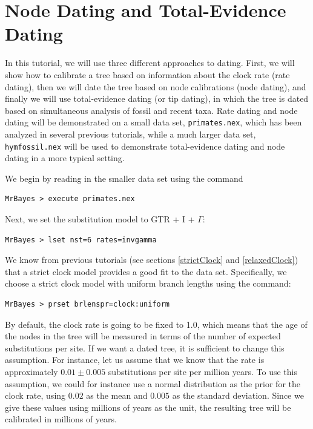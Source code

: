 \documentclass[12pt]{book}
\begin{document}
\section{Node Dating and Total-Evidence Dating}

In this tutorial, we will use three different approaches to dating. First, we will show how to
calibrate a tree based on information about the clock rate (rate dating), then we will date the
tree based on node calibrations (node dating), and finally we will use total-evidence dating (or
tip dating), in which the tree is dated based on simultaneous analysis of fossil and recent taxa.
Rate dating and node dating will be demonstrated on a small data set, \texttt{primates.nex}, which
has been analyzed in several previous tutorials, while a much larger data set,
\texttt{hymfossil.nex} will be used to demonstrate total-evidence dating and node dating in a more
typical setting.

We begin by reading in the smaller data set using the command

\begin{verbatim}
MrBayes > execute primates.nex
\end{verbatim}

Next, we set the substitution model to GTR + I + $\Gamma$:

\begin{verbatim}
MrBayes > lset nst=6 rates=invgamma
\end{verbatim}

We know from previous tutorials (see sections \ref{strictClock} and \ref{relaxedClock}) that a
strict clock model provides a good fit to the data set. Specifically, we choose a strict clock
model with uniform branch lengths using the command:

\begin{verbatim}
MrBayes > prset brlenspr=clock:uniform
\end{verbatim}

By default, the clock rate is going to be fixed to 1.0, which means that the age of the nodes in
the tree will be measured in terms of the number of expected substitutions per site. If we want a
dated tree, it is sufficient to change this assumption. For instance, let us assume that we know
that the rate is approximately $0.01 \pm 0.005$ substitutions per site per million years. To use
this assumption, we could for instance use a normal distribution as the prior for the clock rate,
using $0.02$ as the mean and $0.005$ as the standard deviation. Since we give these values using
millions of years as the unit, the resulting tree will be calibrated in millions of years.
\end{document}
